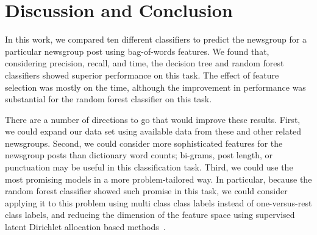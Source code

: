 \documentclass{article} %
\begin{document}
\section{Discussion and Conclusion}

In this work, we compared ten different classifiers to predict the newsgroup for a particular newsgroup post using bag-of-words features. We found that, considering precision, recall, and time, the decision tree and random forest classifiers showed superior performance on this task.  The effect of feature selection was mostly on the time, although the improvement in performance was substantial for the random forest classifier on this task.

There are a number of directions to go that would improve these results. First, we could expand our data set using available data from these and other related newsgroups. Second, we could consider more sophisticated features for the newsgroup posts than dictionary word counts; bi-grams, post length, or punctuation may be useful in this classification task. Third, we could use the most promising models in a more problem-tailored way. In particular, because the random forest classifier showed such promise in this task, we could consider applying it to this problem using multi class class labels instead of one-versus-rest class labels, and reducing the dimension of the feature space using supervised latent Dirichlet allocation based methods~\cite{zhu2009,lacoste2009}. 




\end{document}
